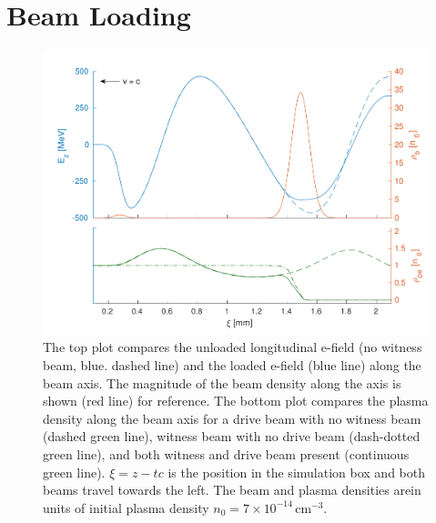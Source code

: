 \documentclass[aps,prstab,reprint,amsmath,amssymb,groupedaddress]{revtex4-1}
\newcommand{\unit}[1]{\,\mathrm{#1}}
\newcommand{\nexp}[1]{\times 10^{#1}}
\begin{document}
\section[\label{S:BL}]{Beam Loading}

\begin{figure}[hbt]
    \includegraphics[width=\linewidth,trim={2mm 0mm 2mm 0mm},clip]{figures/beamLoading}
    \caption{\label{Fig:BeamLoading} The top plot compares the unloaded longitudinal e-field (no witness beam, blue.
        dashed  line) and the loaded e-field (blue line) along the beam axis. The magnitude of the beam density along
        the axis is shown (red line) for reference. The bottom plot compares the plasma density along the beam axis for
        a drive beam with no witness beam (dashed green line), witness beam with no drive beam (dash-dotted green line),
        and both witness and drive beam present (continuous green line). $\xi = z - tc$ is the position in the
        simulation box and both beams travel towards the left. The beam and plasma densities arein units of initial
        plasma density $n_{0} = 7\nexp{-14}\unit{cm}^{-3}$.}
\end{figure}
\end{document}
